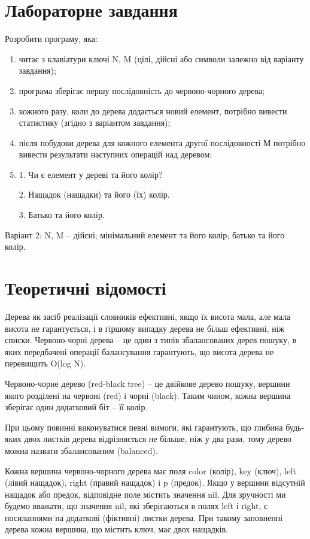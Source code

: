 \documentclass{article}
\begin{document}
\begin{normalsize}
		\section*{Лабораторне завдання}

	Розробити програму, яка:
		\begin{center}
			\begin{enumerate}
				\item читає з клавіатури ключі N, M (цілі, дійсні або символи залежно від варіанту завдання);
				\item програма зберігає першу послідовність до червоно-чорного дерева;
				\item кожного разу, коли до дерева додається новий елемент, потрібно вивести статистику (згідно з варіантом завдання);
				\item після побудови дерева для кожного елемента другої послідовності М потрібно вивести результати наступних операцій над деревом: 
				\item 1. Чи є елемент у дереві та його колір?
				
				2. Нащадок (нащадки) та його (їх) колір.
				
				3. Батько та його колір. 
			\end{enumerate}
		Варіант 2: N, M – дійсні; мінімальний елемент та його колір; батько та його колір. 
		\end{center}
		
		\section*{Теоретичні відомості}
		Дерева як засіб реалізації словників ефективні, якщо їх висота мала, але мала висота не гарантується, і в гіршому випадку дерева не більш ефективні, ніж списки. Червоно-чорні дерева – це один з типів збалансованих дерев пошуку, в яких передбачені операції балансування гарантують, що висота дерева не перевищить O(log N).
		
		Червоно-чорне дерево (red-black tree) – це двійкове дерево пошуку, вершини якого розділені на червоні (red) і чорні (black). Таким чином, кожна вершина зберігає один додатковий біт – її колір.
		
		При цьому повинні виконуватися певні вимоги, які гарантують, що глибина будь-яких двох листків дерева відрізняється не більше, ніж у два рази, тому дерево можна назвати збалансованим (balanced).
		
		Кожна вершина червоно-чорного дерева має поля color (колір), key (ключ), left (лівий нащадок), right (правий нащадок) і p (предок). Якщо у вершини відсутній нащадок або предок, відповідне поле містить значення nil. Для зручності ми будемо вважати, що значення nil, які зберігаються в полях left і right, є посиланнями на додаткові (фіктивні) листки дерева. При такому заповненні дерева кожна вершина, що містить ключ, має двох нащадків.
		

\end{normalsize}
\end{document}
